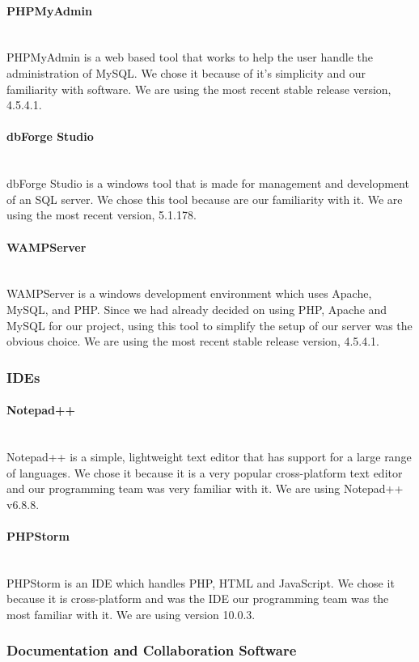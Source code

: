 \documentclass[12pt]{article}
\begin{document}
\paragraph*{PHPMyAdmin}~\\
PHPMyAdmin is a web based tool that works to help the user handle the administration of MySQL. We chose it because of it's simplicity and our familiarity with software. We are using the most recent stable release version, 4.5.4.1.
%
\paragraph*{dbForge Studio}~\\
dbForge Studio is a windows tool that is made for management and development of an SQL server. We chose this tool because are our familiarity with it. We are using the most recent version, 5.1.178.
%
\paragraph*{WAMPServer}~\\
WAMPServer is a windows development environment which uses Apache, MySQL, and PHP. Since we had already decided on using PHP, Apache and MySQL for our project, using this tool to simplify the setup of our server was the obvious choice. We are using the most recent stable release version, 4.5.4.1.
%
\subsubsection{IDEs}
\paragraph*{Notepad++}~\\
Notepad++ is a simple, lightweight text editor that has support for a large range of languages. We chose it because it is a very popular cross-platform text editor and our programming team was very familiar with it. We are using Notepad++ v6.8.8.
%
\paragraph*{PHPStorm}~\\
PHPStorm is an IDE which handles PHP, HTML and JavaScript. We chose it because it is cross-platform and was the IDE our programming team was the most familiar with it. We are using version 10.0.3.
%
%
%
\subsubsection{Documentation and Collaboration Software}
\end{document}

